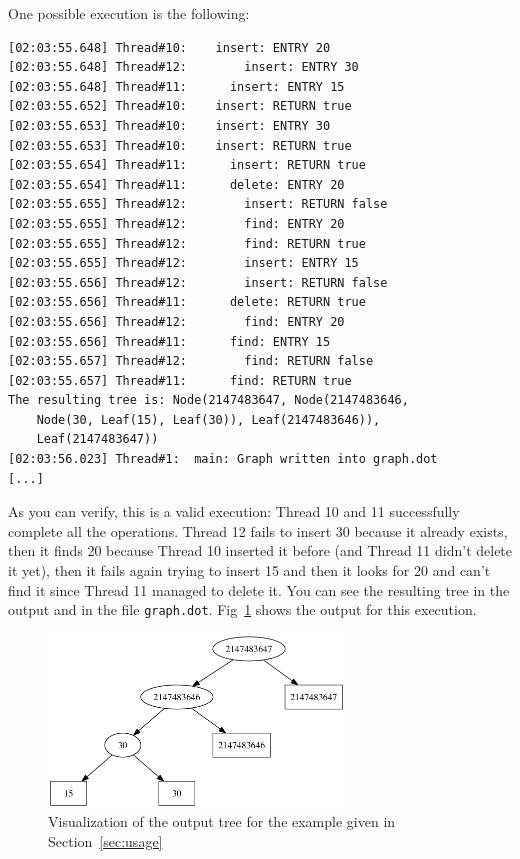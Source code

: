 \documentclass[a4paper,draft,12pt]{article}
\begin{document}
One possible execution is the following:
\begin{verbatim}
[02:03:55.648] Thread#10:    insert: ENTRY 20
[02:03:55.648] Thread#12:        insert: ENTRY 30
[02:03:55.648] Thread#11:      insert: ENTRY 15
[02:03:55.652] Thread#10:    insert: RETURN true
[02:03:55.653] Thread#10:    insert: ENTRY 30
[02:03:55.653] Thread#10:    insert: RETURN true
[02:03:55.654] Thread#11:      insert: RETURN true
[02:03:55.654] Thread#11:      delete: ENTRY 20
[02:03:55.655] Thread#12:        insert: RETURN false
[02:03:55.655] Thread#12:        find: ENTRY 20
[02:03:55.655] Thread#12:        find: RETURN true
[02:03:55.655] Thread#12:        insert: ENTRY 15
[02:03:55.656] Thread#12:        insert: RETURN false
[02:03:55.656] Thread#11:      delete: RETURN true
[02:03:55.656] Thread#12:        find: ENTRY 20
[02:03:55.656] Thread#11:      find: ENTRY 15
[02:03:55.657] Thread#12:        find: RETURN false
[02:03:55.657] Thread#11:      find: RETURN true
The resulting tree is: Node(2147483647, Node(2147483646,
    Node(30, Leaf(15), Leaf(30)), Leaf(2147483646)),
    Leaf(2147483647))
[02:03:56.023] Thread#1:  main: Graph written into graph.dot
[...]
\end{verbatim}

As you can verify, this is a valid execution: Thread 10 and 11 successfully complete all the operations. Thread 12 fails to insert 30 because it already exists, then it finds 20 because Thread 10 inserted it before (and Thread 11 didn't delete it yet), then it fails again trying to insert 15 and then it looks for 20 and can't find it since Thread 11 managed to delete it. You can see the resulting tree in the output and in the file \texttt{graph.dot}. Fig~\ref{fig:test} shows the output for this execution.

\begin{figure}
    \centering
    \includegraphics[width=0.7\textwidth]{test}
    \caption{Visualization of the output tree for the example given in Section~\ref{sec:usage}}
    \label{fig:test}
\end{figure}
\end{document}

